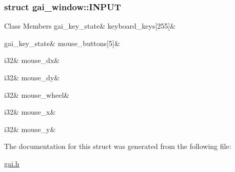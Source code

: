 \subsubsection{struct gai\+\_\+window\+:\+:I\+N\+P\+UT}
\begin{DoxyFields}{Class Members}
\mbox{\label{structgai__window_ad71dabdbe261a269c52bde2c8509dda7}} 
gai\_key\_state&
keyboard\_keys\mbox{[}255\mbox{]}&
\\
\hline

\mbox{\label{structgai__window_ac74ee49ef25854725042f071982280ae}} 
gai\_key\_state&
mouse\_buttons\mbox{[}5\mbox{]}&
\\
\hline

\mbox{\label{structgai__window_ae768fbdf4db1fd19b9a501b197ca9176}} 
i32&
mouse\_dx&
\\
\hline

\mbox{\label{structgai__window_a7a8a489cec34e1df7d704b4338b1bcea}} 
i32&
mouse\_dy&
\\
\hline

\mbox{\label{structgai__window_ab4fdfc85ac0563ad1daebfc354e5b6a4}} 
i32&
mouse\_wheel&
\\
\hline

\mbox{\label{structgai__window_aada9bddfeb8748fa82a5c3e648695968}} 
i32&
mouse\_x&
\\
\hline

\mbox{\label{structgai__window_a1bf17e49446857bd04deaffb5e666bc5}} 
i32&
mouse\_y&
\\
\hline

\end{DoxyFields}


The documentation for this struct was generated from the following file\+:\begin{DoxyCompactItemize}
\item 
\hyperlink{gai_8h}{gai.\+h}\end{DoxyCompactItemize}
